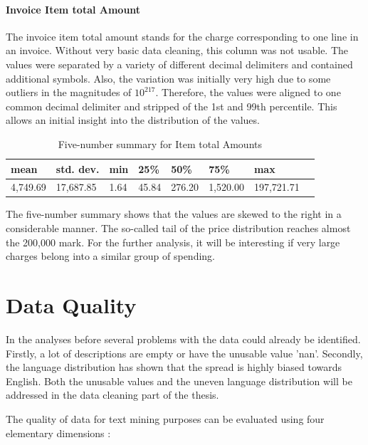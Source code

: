 \paragraph{Invoice Item total Amount}
The invoice item total amount stands for the charge corresponding to one line in an invoice. Without very basic data cleaning, this column was not usable. The values were separated by a variety of different decimal delimiters and contained additional symbols. Also, the variation was initially very high due to some outliers in the magnitudes of $10^{217}$. Therefore, the values were aligned to one common decimal delimiter and stripped of the 1st and 99th percentile. This allows an initial insight into the distribution of the values.

\begin{table}[!h]
	\caption{Five-number summary for Item total Amounts}
	\centering
	\begin{tabular}{llllllll}
		\toprule
		 \textbf{mean} & \textbf{std. dev.} & \textbf{min} & \textbf{25\%} & \textbf{50\%} & \textbf{75\%} & \textbf{max} \\
		\midrule
		  4,749.69      & 17,687.85          & 1.64         & 45.84         & 276.20        & 1,520.00      & 197,721.71  \\
		\bottomrule
	\end{tabular}
\end{table}

The five-number summary shows that the values are skewed to the right in a considerable manner. The so-called tail of the price distribution reaches almost the 200,000 mark. For the further analysis, it will be interesting if very large charges belong into a similar group of spending.

\section{Data Quality}
In the analyses before several problems with the data could already be identified. Firstly, a lot of descriptions are empty or have the unusable value 'nan'. Secondly, the language distribution has shown that the spread is highly biased towards English. 
Both the unusable values and the uneven language distribution will be addressed in the data cleaning part of the thesis.

The quality of data for text mining purposes can be evaluated using four elementary dimensions \cite[p.~1279]{dataQualityAzeroual} :

